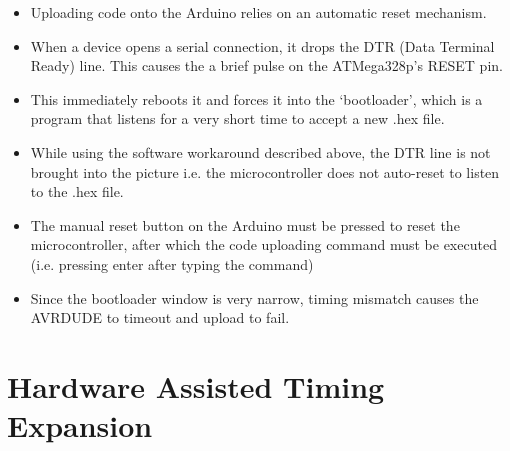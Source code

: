 \documentclass[conference]{IEEEtran} %
\begin{document}
\begin{itemize}
    \item Uploading code onto the Arduino relies on an automatic reset mechanism.
    \item When a device opens a serial connection, it drops the DTR (Data Terminal Ready) line. This causes the a brief pulse on the ATMega328p's RESET pin. 
    \item This immediately reboots it and forces it into the `bootloader', which is a program that listens for a very short time to accept a new .hex file. 
    \item While using the software workaround described above, the DTR line is not brought into the picture i.e. the microcontroller does not auto-reset to listen to the .hex file. 
    \item The manual reset button on the Arduino must be pressed to reset the microcontroller, after which the code uploading command must be executed (i.e. pressing enter after typing the command)
    \item Since the bootloader window is very narrow, timing mismatch causes the AVRDUDE to timeout and upload to fail. 
\end{itemize}



\section{Hardware Assisted Timing Expansion}
\end{document}
